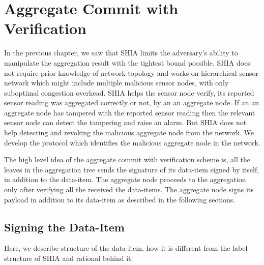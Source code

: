 \chapter{Aggregate Commit with Verification} %
\label{cha:A Protocol for Commitment Tree Generation}
	In the previous chapter, we saw that SHIA limits the adversary's ability to manipulate the aggregation result with the tightest bound possible.
	SHIA does not require prior knowledge of network topology and works on hierarchical sensor network which might include multiple malicious sensor nodes, with only suboptimal congestion overhead.
	SHIA helps the sensor node verify, its reported sensor reading was aggregated correctly or not, by an an aggregate node.
	If an an aggregate node has tampered with the reported sensor reading then the relevant sensor node can detect the tampering and raise an alarm.
	But SHIA does not help detecting and revoking the malicious aggregate node from the network.
	We develop the protocol which identifies the malicious aggregate node in the network.
	
	The high level idea of the aggregate commit with verification scheme is, all the leaves in the aggregation tree sends the signature of its data-item signed by itself, in addition to the data-item.
	The aggregate node proceeds to the aggregation only after verifying all the received the data-items.
	The aggregate node signs its payload in addition to its data-item as described in the following sections.

\section{Signing the Data-Item}
	Here, we describe structure of the data-item, how it is different from the label structure of SHIA and rational behind it.

